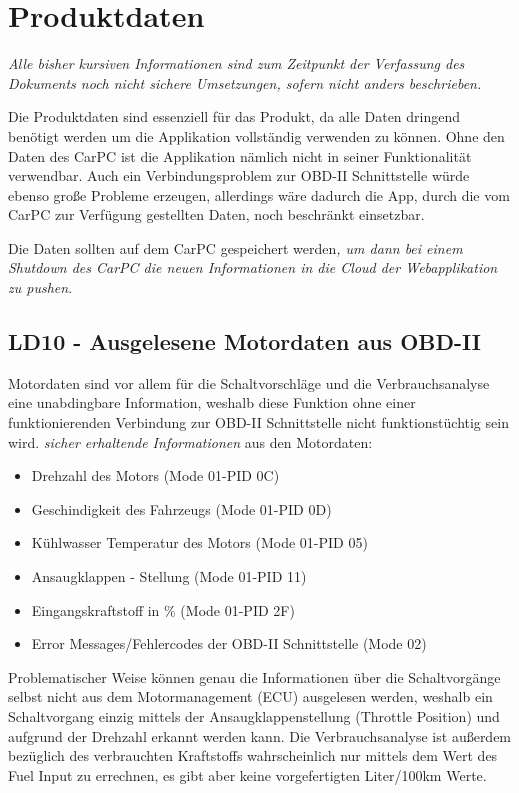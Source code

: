 \chapter{Produktdaten}
\textit{Alle bisher kursiven Informationen sind zum Zeitpunkt der Verfassung des Dokuments noch nicht sichere Umsetzungen, sofern nicht anders beschrieben.}

Die Produktdaten sind essenziell für das Produkt, da alle Daten dringend benötigt werden um die Applikation vollständig verwenden zu können. Ohne den Daten des CarPC ist die Applikation nämlich nicht in seiner Funktionalität verwendbar. Auch ein Verbindungsproblem zur OBD-II Schnittstelle würde ebenso große Probleme erzeugen, allerdings wäre dadurch die App, durch die vom CarPC zur Verfügung gestellten Daten, noch beschränkt einsetzbar.

Die Daten sollten auf dem CarPC gespeichert werden\textit{, um dann bei einem Shutdown des CarPC die neuen Informationen in die Cloud der Webapplikation zu pushen}.

\section{LD10 - Ausgelesene Motordaten aus OBD-II}
Motordaten sind vor allem für die Schaltvorschläge und die Verbrauchsanalyse eine unabdingbare Information, weshalb diese Funktion ohne einer funktionierenden Verbindung zur OBD-II Schnittstelle nicht funktionstüchtig sein wird.
\textit{sicher erhaltende Informationen} aus den Motordaten:
\begin{itemize}
	\item Drehzahl des Motors (Mode 01-PID 0C)
	\item Geschindigkeit des Fahrzeugs (Mode 01-PID 0D)
	\item Kühlwasser Temperatur des Motors (Mode 01-PID 05)
	\item Ansaugklappen - Stellung (Mode 01-PID 11)
	\item Eingangskraftstoff in \% (Mode 01-PID 2F)
	\item Error Messages/Fehlercodes der OBD-II Schnittstelle (Mode 02)
\end{itemize}
Problematischer Weise können genau die Informationen über die Schaltvorgänge selbst nicht aus dem Motormanagement (ECU) ausgelesen werden, weshalb ein Schaltvorgang einzig mittels der Ansaugklappenstellung (Throttle Position) und aufgrund der Drehzahl erkannt werden kann.
Die Verbrauchsanalyse ist außerdem bezüglich des verbrauchten Kraftstoffs wahrscheinlich nur mittels dem Wert des Fuel Input zu errechnen, es gibt aber keine vorgefertigten Liter/100km Werte.

